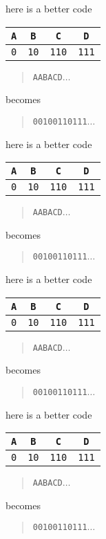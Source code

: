 \documentclass{beamer}
\newcommand{\cred}{\color{red}}
\newcommand{\cblu}{\color{blue}}
\newcommand{\cgre}{\color{green}}
\newcommand{\letter}[1]{\color{blue}\texttt{#1}\color{black}}
\newcommand{\binary}[1]{\color{red}\texttt{#1}\color{black}}
\begin{document}
\begin{frame}{here is a better code}
\begin{center}
\begin{tabular}{cccc}
\letter{A}&\letter{B}&\letter{C}&\letter{D}\\
\hline
\binary{0}&\binary{10}&\binary{110}&\binary{111}
\end{tabular}
\end{center}
  \begin{quote}
    \letter{AA\cgre B\cblu{}ACD}$\ldots$
  \end{quote}
  becomes
    \begin{quote}
    \binary{00\cgre 10\cred{}0110111}$\ldots$
    \end{quote}
\end{frame}  


\begin{frame}{here is a better code}
\begin{center}
\begin{tabular}{cccc}
\letter{A}&\letter{B}&\letter{C}&\letter{D}\\
\hline
\binary{0}&\binary{10}&\binary{110}&\binary{111}
\end{tabular}
\end{center}
  \begin{quote}
    \letter{AAB\cgre A\cblu{}CD}$\ldots$
  \end{quote}
  becomes
    \begin{quote}
    \binary{0010\cgre 0\cred{}110111}$\ldots$
    \end{quote}
\end{frame}  


\begin{frame}{here is a better code}
\begin{center}
\begin{tabular}{cccc}
\letter{A}&\letter{B}&\letter{C}&\letter{D}\\
\hline
\binary{0}&\binary{10}&\binary{110}&\binary{111}
\end{tabular}
\end{center}
  \begin{quote}
    \letter{AABA\cgre C\cblu{}D}$\ldots$
  \end{quote}
  becomes
    \begin{quote}
    \binary{00100\cgre 110\cred{}111}$\ldots$
    \end{quote}
\end{frame}  


\begin{frame}{here is a better code}
\begin{center}
\begin{tabular}{cccc}
\letter{A}&\letter{B}&\letter{C}&\letter{D}\\
\hline
\binary{0}&\binary{10}&\binary{110}&\binary{111}
\end{tabular}
\end{center}
  \begin{quote}
    \letter{AABAC\cgre D\cblu{}}$\ldots$
  \end{quote}
  becomes
    \begin{quote}
    \binary{00100110\cgre 111\cred{}}$\ldots$
    \end{quote}
\end{frame}  
\end{document}
